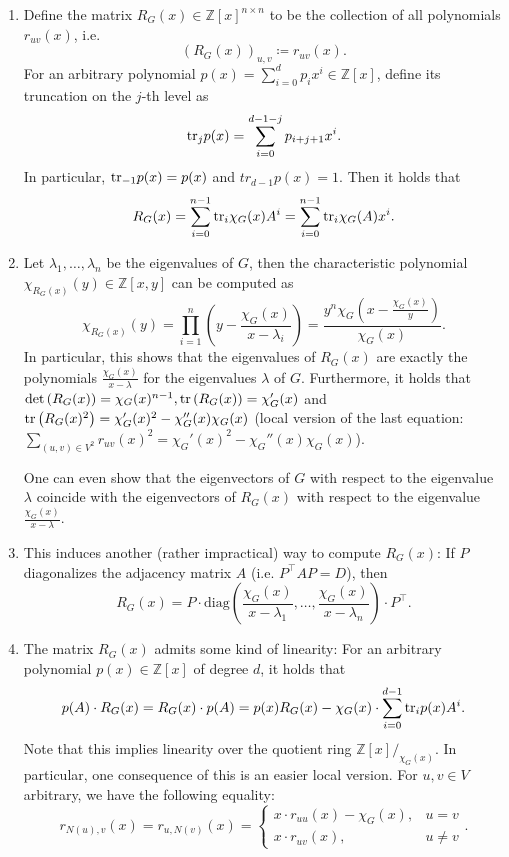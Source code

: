 \documentclass[a4paper,12pt]{article}
\begin{document}
\begin{enumerate}
\item 
Define the matrix $R_G(x) \in \mathbb{Z}[x]^{n\times n}$ to be the collection of all polynomials $r_{uv}(x)$, i.e.
$$
\left(R_G(x)\right)_{u,v} \coloneqq r_{uv}(x).
$$
For an arbitrary polynomial $p(x) = \sum_{i=0}^d p_ix^i \in \mathbb{Z}[x]$, define its truncation on the $j$-th level as
$$
\mathrm{tr}_jp(x) = \sum_{i=0}^{d-1-j}p_{i+j+1}x^i.
$$
In particular, $\mathrm{tr}_{-1}p(x) = p(x)$ and $tr_{d-1}p(x) = 1$. Then it holds that
$$
R_G(x) = \sum_{i=0}^{n-1}\mathrm{tr}_i\chi_G(x)A^i = \sum_{i=0}^{n-1}\mathrm{tr}_i\chi_G(A)x^i.
$$

\item 
Let $\lambda_1, \ldots, \lambda_n$ be the eigenvalues of $G$, then the characteristic polynomial $\chi_{R_G(x)}(y) \in \mathbb{Z}[x,y]$ can be computed as
$$
\chi_{R_G(x)}(y) = \prod_{i=1}^n\left(y - \frac{\chi_G(x)}{x-\lambda_i}\right) = \frac{y^n \chi_G\left(x-\frac {\chi_G(x)}y\right)}{\chi_G(x)}.
$$
In particular, this shows that the eigenvalues of $R_G(x)$ are exactly the polynomials $\frac{\chi_G(x)}{x-\lambda}$ for the eigenvalues $\lambda$ of $G$. Furthermore, it holds that $\det\left(R_G(x)\right) = \chi_G(x)^{n-1}, \mathrm{tr}\left(R_G(x)\right) = \chi_G'(x)$ and $\mathrm{tr}\left(R_G(x)^2\right) = \chi_G'(x)^2 - \chi_G''(x)\chi_G(x)$ (local version of the last equation: $\sum_{(u,v)\in V^2}r_{uv}(x)^2 = \chi_G'(x)^2 - \chi_G''(x)\chi_G(x)$).

One can even show that the eigenvectors of $G$ with respect to the eigenvalue $\lambda$ coincide with the eigenvectors of $R_G(x)$ with respect to the eigenvalue $\frac{\chi_G(x)}{x-\lambda}$.

\item 
This induces another (rather impractical) way to compute $R_G(x)$: If $P$ diagonalizes the adjacency matrix $A$ (i.e. $P ^\top A P = D$), then
$$
R_G(x) = P \cdot \mathrm{diag}\left(\frac{\chi_G(x)}{x-\lambda_1}, \ldots, \frac{\chi_G(x)}{x-\lambda_n}\right) \cdot P^\top.
$$

\item 
The matrix $R_G(x)$ admits some kind of linearity: For an arbitrary polynomial $p(x) \in \mathbb{Z}[x]$ of degree $d$, it holds that
$$
p(A) \cdot R_G(x) = R_G(x) \cdot p(A) = p(x) R_G(x) - \chi_G(x) \cdot \sum_{i=0}^{d-1} \mathrm{tr}_ip(x)A^i.
$$
Note that this implies linearity over the quotient ring $\mathbb{Z}[x]/_{\chi_G(x)}$.
In particular, one consequence of this is an easier local version. For $u,v \in V$ arbitrary, we have the following equality:
$$
r_{N(u),v}(x) = r_{u, N(v)}(x) = \begin{cases}
x \cdot r_{uu}(x) - \chi_G(x), & u = v\\
x \cdot r_{uv}(x), & u \neq v
\end{cases}.
$$



\end{enumerate}
\end{document}
